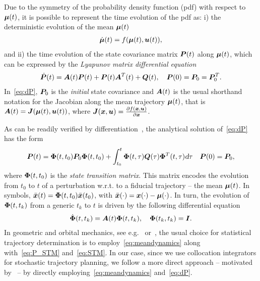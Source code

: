 Due to the symmetry of the probability density function (pdf) with respect to $\boldsymbol{\mu}(t)$, it is possible to represent the time evolution of the pdf as: i) the deterministic evolution of the mean $\boldsymbol{\mu}(t)$
\begin{align}\label{eq:meandynamics}
\dbmu(t) = f(\bmu(t), \bu(t)),
\end{align}
and ii) the time evolution of the state covariance matrix $\boldsymbol{P}(t)$ along $\boldsymbol{\mu}(t)$, which can be expressed by the \emph{Lyapunov matrix differential equation}
\begin{align}\label{eq:dP}
\dbP(t) = \bA(t) \bP(t) + \bP(t) \bA^T(t) + \bQ(t),\quad \bP(0) = \bP_0 = \bP_0^T.
\end{align}
In~\eqref{eq:dP}, $\boldsymbol{P}_0$ is the \emph{initial} state covariance and $\boldsymbol{A}(t)$ is the usual shorthand notation for the Jacobian along the mean trajectory $\boldsymbol{\mu}(t)$, that is $\boldsymbol{A}(t)=\boldsymbol{J}(\boldsymbol{\mu}(t),\boldsymbol{u}(t))$, where $\boldsymbol{J}(\boldsymbol{x}, \boldsymbol{u}) = \frac{\partial f(\boldsymbol{x}, \boldsymbol{u})}{\partial \boldsymbol{x}}$.

As can be readily verified by differentiation~\cite{Gajic:LyapunovMatrixEquation:2010}, the analytical solution of~\eqref{eq:dP} has the form
\begin{align}\label{eq:P_STM}
\bP(t) = \bPhi(t,t_0) \bP_0 \bPhi(t,t_0)+\int_{t_0}^{t} \bPhi(t,\tau) \bQ(\tau) \bPhi^T(t,\tau) \dd \tau \quad \bP(0)=\bP_0,
\end{align}
where $\boldsymbol{\Phi}(t,t_0)$ is the \emph{state transition matrix}. This matrix encodes the evolution from $t_0$ to $t$ of a perturbation w.r.t. to a fiducial trajectory -- the mean $\boldsymbol{\mu}(t)$. In symbols, $\bar{\boldsymbol{x}}(t) = \boldsymbol{\Phi}(t,t_0) \bar{\boldsymbol{x}}(t_0)$, with $\bar{\boldsymbol{x}}(\cdot) =\boldsymbol{x}(\cdot) - \boldsymbol{\mu}(\cdot) $. In turn, the evolution of $\boldsymbol{\Phi}(t,t_k)$ from a generic $t_k$ to $t$ is driven by the following differential equation
\begin{align}\label{eq:STM}
\dbPhi(t,t_k) = \bA(t)\bPhi(t,t_k), \quad \bPhi(t_k, t_k) = \bI.
\end{align}
In geometric and orbital mechanics, see e.g.~\cite{Maruskin:DynamicalSystemsGeometric:2018} or~\cite{Tapley:StatisticalOrbitDetermination:2004}, the usual choice for statistical trajectory determination is to employ~\eqref{eq:meandynamics} along with~\eqref{eq:P_STM} and~\eqref{eq:STM}. In our case, since we use collocation integrators for stochastic trajectory planning, we follow a more direct approach -- motivated by~\cite{Gillis:PracticalMethodsApproximate:2015} -- by directly employing~\eqref{eq:meandynamics} and~\eqref{eq:dP}.

